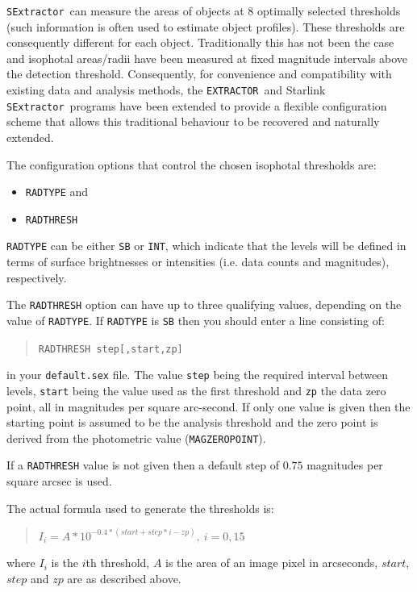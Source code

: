 \documentclass[twoside,11pt]{article}
\renewcommand{\_}{\texttt{\symbol{95}}}
\newcommand{\EXTRACTOR}{\texttt{EXTRACTOR}}
\newcommand{\SExtractor}{\texttt{SExtractor}}
\begin{document}
\SExtractor\ can measure the areas of objects at $8$ optimally selected
thresholds (such information is often used to estimate object
profiles). These thresholds are consequently different for each
object. Traditionally this has not been the case and isophotal
areas/radii have been measured at fixed magnitude intervals above the
detection threshold. Consequently, for convenience and compatibility
with existing data and analysis methods, the \EXTRACTOR\ and Starlink
\SExtractor\ programs have been extended to provide a flexible
configuration scheme that allows this traditional behaviour to be
recovered and naturally extended.

The configuration options that control the chosen isophotal thresholds 
are:
\begin{itemize}
  \item \texttt{RAD\_TYPE} and
  \item \texttt{RAD\_THRESH}
\end{itemize}
\texttt{RAD\_TYPE} can be either \texttt{SB} or \texttt{INT}, 
which indicate that the levels will be defined in terms of surface
brightnesses or intensities (i.e. data counts and magnitudes),
respectively.

The \texttt{RAD\_THRESH} option can have up to three qualifying
values, depending on the value of \texttt{RAD\_TYPE}. If
\texttt{RAD\_TYPE} is \texttt{SB} then you should enter a line
consisting of:
\begin{quote}
   \texttt{RAD\_THRESH\hspace{0.5in} step[,start,zp]}
\end{quote}
in your \texttt{default.sex} file. The value \texttt{step} being the
required interval between levels, \texttt{start} being the value used
as the first threshold and \texttt{zp} the data zero point, all in
magnitudes per square arc-second. If only one value is given then the
starting point is assumed to be the analysis threshold and the zero
point is derived from the photometric value (\texttt{MAG\_ZEROPOINT}).

If a \texttt{RAD\_THRESH} value is not given then a default step of
$0.75$ magnitudes per square arcsec is used.

The actual formula used to generate the thresholds is:
\begin{quote}
    $I_{i} = A * 10^{-0.4 * (start+step*i-zp)},\ i = 0, 15$
\end{quote}
where $I_{i}$ is the $i$th threshold, $A$ is the area of an image pixel 
in arcseconds, $start$, $step$ and $zp$ are as described above.
\end{document}
